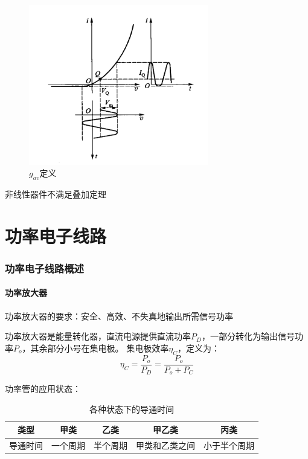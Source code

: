 \documentclass[10pt]{article}
\begin{document}
   \begin{figure}[H] %
    \centering %
    \includegraphics[width=0.7\textwidth]{pictures/1-3.png} %
    \caption{$g_{av}$定义} %
    \label{fig.1-1} %
    \end{figure}

 非线性器件不满足叠加定理

\newpage
\part{功率电子线路}
\section{功率电子线路概述}
\subsection{功率放大器}
功率放大器的要求：安全、高效、不失真地输出所需信号功率\par
功率放大器是能量转化器，直流电源提供直流功率$P_D$，一部分转化为输出信号功率$P_o$，其余部分小号在集电极。
集电极效率$\eta_C$，定义为：
$$
\eta_C = \frac{P_o}{P_D} = \frac{P_o}{P_o + P_C}
$$

功率管的应用状态：
\begin{table}[h]
    \centering
    \begin{tabular}{|c|c|c|c|c|}
    \hline
    类型 & 甲类 & 乙类 & 甲乙类&丙类 \\
    \hline
    导通时间 & 一个周期 & 半个周期 &甲类和乙类之间& 小于半个周期 \\
    \hline
    \end{tabular}
    \caption{各种状态下的导通时间}
    \label{tab:example}
\end{table}
\end{document}
